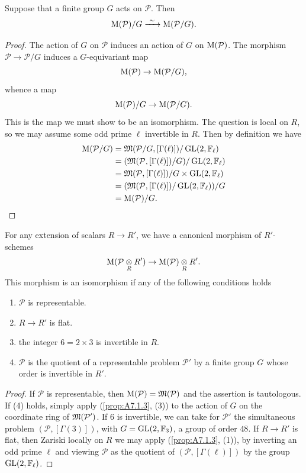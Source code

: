 \begin{klem}\label{lem:8.1.5}
Suppose that a finite group $G$ acts on $\mathcal{P}$. Then
\[
\Mcoarse(\mathcal{P})/G \xrightarrow{\ \sim\ } \Mcoarse(\mathcal{P}/G) .
\]
\end{klem}

\begin{proof}
The action of $G$ on $\mathcal{P}$ induces an action of $G$ on $\mathrm{M}(\mathcal{P})$. The morphism $\mathcal{P} \to \mathcal{P}/G$ induces a $G$-equivariant map
\[
\mathrm{M}(\mathcal{P}) \to \mathrm{M}(\mathcal{P}/G) ,
\]
whence a map
\[
\mathrm{M}(\mathcal{P})/G \to \mathrm{M}(\mathcal{P}/G) .
\]
This is the map we must show to be an isomorphism. The question is local on $R$, so we may assume some odd prime $\ell$ invertible in $R$. Then by definition we have
\begin{align*}
\mathrm{M}(\mathcal{P}/G) &= \mathfrak{M}(\mathcal{P}/G, [\Gamma(\ell)])/\operatorname{GL}(2, \mathbb{F}_\ell) \\
&= (\mathfrak{M}(\mathcal{P}, [\Gamma(\ell)])/G)/\operatorname{GL}(2, \mathbb{F}_\ell) \\
&= \mathfrak{M}(\mathcal{P}, [\Gamma(\ell)])/G \times \operatorname{GL}(2, \mathbb{F}_\ell) \\
&= (\mathfrak{M}(\mathcal{P}, [\Gamma(\ell)])/\operatorname{GL}(2, \mathbb{F}_\ell))/G \\
&= \mathrm{M}(\mathcal{P})/G . \qedhere
\end{align*}
\end{proof}

\begin{kprop}\label{prop:8.1.6}
For any extension of scalars $R \to R'$, we have a canonical morphism of $R'$-schemes
\[
\mathrm{M}(\mathcal{P} \underset{R}{\otimes} R') \to \mathrm{M}(\mathcal{P}) \underset{R}{\otimes} R' .
\]
This morphism is an isomorphism if any of the following conditions holds
\begin{enumerate}[(1)]
\item $\mathcal{P}$ is representable.
\item $R \to R'$ is flat.
\item the integer $6 = 2 \times 3$ is invertible in $R$.
\item $\mathcal{P}$ is the quotient of a representable problem $\mathcal{P}'$ by a finite group $G$ whose order is invertible in $R'$.
\end{enumerate}
\end{kprop}

\begin{proof}
If $\mathcal{P}$ is representable, then $\mathrm{M}(\mathcal{P}) = \mathfrak{M}(\mathcal{P})$ and the assertion is tautologous. If (4) holds, simply apply (\ref{prop:A7.1.3}, (3)) to the action of $G$ on the coordinate ring of $\mathfrak{M}(\mathcal{P}')$. If $6$ is invertible, we can take for $\mathcal{P}'$ the simultaneous problem $(\mathcal{P}, [\Gamma(3)])$, with $G = \operatorname{GL}(2, \mathbb{F}_3)$, a group of order $48$. If $R \to R'$ is flat, then Zariski locally on $R$ we may apply (\ref{prop:A7.1.3}, (1)), by inverting an odd prime $\ell$ and viewing $\mathcal{P}$ as the quotient of $(\mathcal{P}, [\Gamma(\ell)])$ by the group $\operatorname{GL}(2, \mathbb{F}_\ell)$.
\end{proof}

